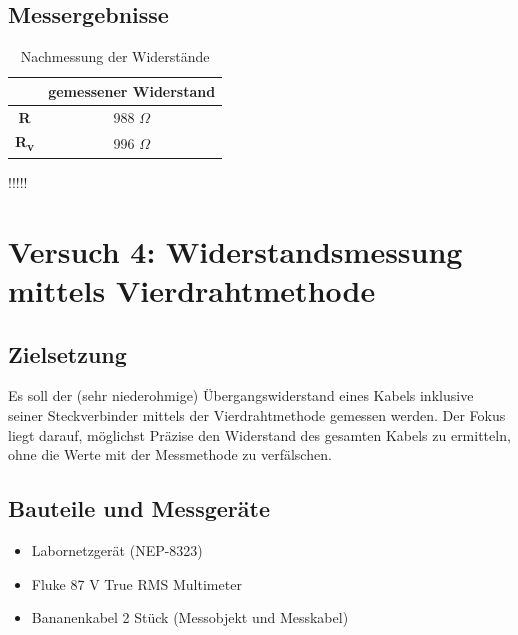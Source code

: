 \documentclass[a4paper,12pt]{article}
\begin{document}
\subsection{Messergebnisse}
\begin{table}[H]
	\centering
	\begin{tabular}{|c|c|}
		\hline
		  & gemessener Widerstand\\
		\hline		
		\textbf{R} & 988 $\Omega$\\
		\hline
		\textbf{R\textsubscript{v}} & 996 $\Omega$\\
		\hline
	\end{tabular}
	\caption{Nachmessung der Widerstände}
\end{table}
!!!!!


\newpage
\section{Versuch 4: Widerstandsmessung mittels Vierdrahtmethode}
\subsection{Zielsetzung}
Es soll der (sehr niederohmige) Übergangswiderstand eines Kabels inklusive seiner Steckverbinder
mittels der Vierdrahtmethode gemessen werden. Der Fokus liegt darauf, möglichst Präzise den Widerstand des gesamten Kabels zu ermitteln, ohne die Werte mit der Messmethode zu verfälschen.

\subsection{Bauteile und Messgeräte}
\begin{itemize}
\item Labornetzgerät (NEP-8323)
\item Fluke 87 V True RMS Multimeter
\item Bananenkabel 2 Stück (Messobjekt und Messkabel)
\end{itemize}
\end{document}
